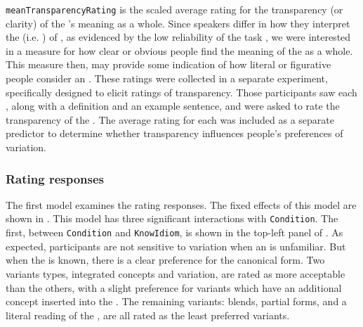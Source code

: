 \documentclass[output=paper
,modfonts
,nonflat]{langsci/langscibook}
\begin{document}
\texttt{meanTransparencyRating} is the scaled average rating for the transparency (or clarity) of the 's meaning as a whole. Since speakers differ in how they interpret the  (i.e. )  of , as evidenced by the low reliability of the   task \citep{TitoneConnine1994, TabossiEtAl2008}, we were interested in a measure for how clear or obvious people find the meaning of the  as a whole. This measure then, may provide some indication of how literal or figurative people consider an . These ratings were collected in a separate experiment, specifically designed to elicit ratings of transparency. Those participants saw each , along with a definition and an example sentence, and were asked to rate the transparency of the  \citep[for further details, see][]{Geeraert2016}. The average rating for each  was included as a separate predictor to determine whether transparency influences people's preferences of variation. 



\subsubsection{Rating responses}

The first model examines the rating responses. The fixed effects of this model are shown in . This model has three significant interactions with \texttt{Condition}. The first, between \texttt{Condition} and \texttt{KnowIdiom}, is shown in the top-left panel of . As expected, participants are not sensitive to variation  when an  is unfamiliar. But when the   is known, there is a clear preference for the canonical form. Two variants types, integrated concepts  and  variation,  are rated as more acceptable  than the others, with a slight preference for variants which have an additional concept inserted into the . The remaining variants:  blends,  partial forms,  and a literal reading  of the , are all rated as the least preferred variants.
\end{document}

